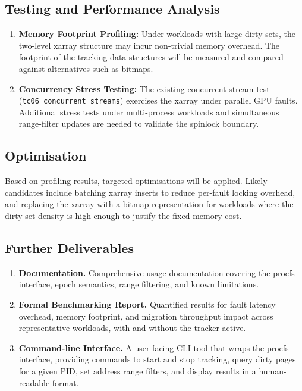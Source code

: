 \subsection*{Testing and Performance Analysis}

\begin{enumerate}

    \item \textbf{Memory Footprint Profiling:}
          Under workloads with large dirty sets, the two-level xarray structure may incur
          non-trivial memory overhead. The footprint of the tracking data structures will be
          measured and compared against alternatives such as bitmaps.

    \item \textbf{Concurrency Stress Testing:}
          The existing concurrent-stream test (\texttt{tc06\_concurrent\_streams}) exercises
          the xarray under parallel GPU faults. Additional stress tests under multi-process
          workloads and simultaneous range-filter updates are needed to validate the spinlock
          boundary.
\end{enumerate}

\subsection*{Optimisation}

Based on profiling results, targeted optimisations will be applied. Likely candidates include
batching xarray inserts to reduce per-fault locking overhead, and replacing the xarray with a
bitmap representation for workloads where the dirty set density is high enough to justify the
fixed memory cost.

\subsection*{Further Deliverables}

\begin{enumerate}
    \item \textbf{Documentation.}
          Comprehensive usage documentation covering the procfs interface, epoch semantics,
          range filtering, and known limitations.

    \item \textbf{Formal Benchmarking Report.}
          Quantified results for fault latency overhead, memory footprint, and migration
          throughput impact across representative workloads, with and without the tracker active.

    \item \textbf{Command-line Interface.}
          A user-facing CLI tool that wraps the procfs interface, providing commands to start
          and stop tracking, query dirty pages for a given PID, set address range filters, and
          display results in a human-readable format.
\end{enumerate}
